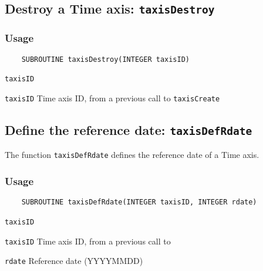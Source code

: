 \subsection{Destroy a Time axis: \texttt{taxisDestroy}}
\label{taxisDestroy}
\subsubsection*{Usage}

\begin{verbatim}
    SUBROUTINE taxisDestroy(INTEGER taxisID)
\end{verbatim}

\hspace*{4mm}\begin{minipage}[]{15cm}
\begin{deflist}{\texttt{taxisID}\ }
\item[\texttt{taxisID}]
Time axis ID, from a previous call to {\texttt{taxisCreate}}

\end{deflist}
\end{minipage}


\subsection{Define the reference date: \texttt{taxisDefRdate}}
\label{taxisDefRdate}

The function {\texttt{taxisDefRdate}} defines the reference date of a Time axis.

\subsubsection*{Usage}

\begin{verbatim}
    SUBROUTINE taxisDefRdate(INTEGER taxisID, INTEGER rdate)
\end{verbatim}

\hspace*{4mm}\begin{minipage}[]{15cm}
\begin{deflist}{\texttt{taxisID}\ }
\item[\texttt{taxisID}]
Time axis ID, from a previous call to {}
\item[\texttt{rdate}]
Reference date (YYYYMMDD)

\end{deflist}
\end{minipage}


